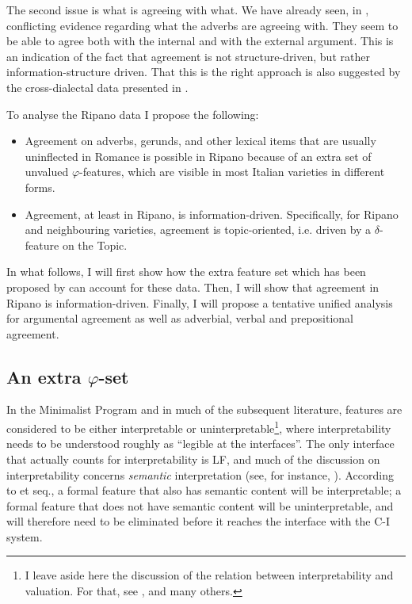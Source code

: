 \documentclass[output=paper
,modfonts
,nonflat]{langsci/langscibook}
\begin{document}
The second issue is what is agreeing with what. We have already seen, in , conflicting evidence regarding what the adverbs are agreeing with. They seem to be able to agree both with the internal and with the external argument. This is an indication of the fact that agreement is not structure-driven, but rather information-structure driven. That this is the right approach is also suggested by the cross-dialectal data presented in .

To analyse the Ripano data I propose the following:
\begin{itemize}
	\item
		Agreement on adverbs, gerunds, and other lexical items that are usually uninflected in Romance is possible in Ripano because of an extra set of unvalued $\varphi $-features, which are visible in most Italian varieties in different forms.
	\item 
		Agreement, at least in Ripano, is information-driven. Specifically, for Ripano and neighbouring varieties, agreement is topic-oriented, i.e. driven by a $\delta $-feature on the Topic. 
\end{itemize}
In what follows, I will first show how the extra feature set which has been proposed by \citet{D`Alessandro2017} can account for these data. Then, I will show that agreement in Ripano is information-driven. Finally, I will propose a tentative unified analysis for argumental agreement as well as adverbial, verbal and prepositional agreement.

\subsection{An extra \texorpdfstring{$\varphi$}{\textphi}-set} \label{sec-dalessandro:3.2}
In the Minimalist Program \citep{Chomsky1995} and in much of the subsequent literature, features are considered to be either interpretable or uninterpretable\footnote{
I leave aside here the discussion of the relation between interpretability and valuation. For that, see \citet{Pesetsky_Torrego2007}, \citet{Zeijlstra2008} and many others.}, where interpretability needs to be understood roughly as “legible at the interfaces”. The only interface that actually counts for interpretability is LF, and much of the discussion on interpretability concerns \textit{semantic} interpretation (see, for instance, \citealt{Zeijlstra2008}). According to \citet{Zeijlstra2008} et seq., a formal feature that also has semantic content will be interpretable; a formal feature that does not have semantic content will be uninterpretable, and will therefore need to be eliminated before it reaches the interface with the C-I system.
\end{document}
